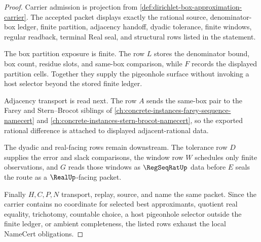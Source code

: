 \begin{proof}
Carrier admission is projection from \autoref{def:dirichlet-box-approximation-carrier}. The accepted packet displays exactly the rational source, denominator-box ledger, finite partition, adjacency handoff, dyadic tolerance, finite windows, regular readback, terminal Real seal, and structural rows listed in the statement.

The box partition exposure is finite. The row $L$ stores the denominator bound, box count, residue slots, and same-box comparison, while $F$ records the displayed partition cells. Together they supply the pigeonhole surface without invoking a host selector beyond the stored finite ledger.

Adjacency transport is read next. The row $A$ sends the same-box pair to the Farey and Stern--Brocot siblings of \autoref{ch:concrete-instances-farey-sequence-namecert} and \autoref{ch:concrete-instances-stern-brocot-namecert}, so the exported rational difference is attached to displayed adjacent-rational data.

The dyadic and real-facing rows remain downstream. The tolerance row $D$ supplies the error and slack comparisons, the window row $W$ schedules only finite observations, and $G$ reads those windows as $\RegSeqRatUp$ data before $E$ seals the route as a $\RealUp$-facing packet.

Finally $H,C,P,N$ transport, replay, source, and name the same packet. Since the carrier contains no coordinate for selected best approximants, quotient real equality, trichotomy, countable choice, a host pigeonhole selector outside the finite ledger, or ambient completeness, the listed rows exhaust the local NameCert obligations.
\end{proof}

